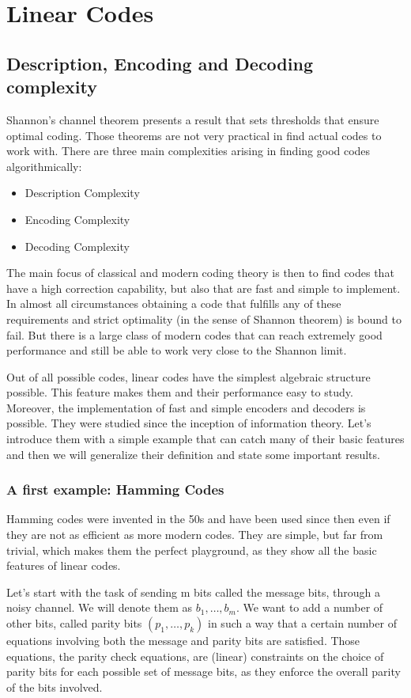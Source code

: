 
\chapter{Linear Codes}
\section{Description, Encoding and Decoding complexity}
Shannon's channel theorem presents a result that sets thresholds that ensure optimal coding. Those theorems are not very practical in find actual codes to work with. There are three main complexities arising in finding good codes algorithmically:
\begin{itemize}
	\item Description Complexity
	\item Encoding Complexity
	\item Decoding Complexity
\end{itemize}

The main focus of classical and modern coding theory is then to find codes that have a high correction capability, but also that are fast and simple to implement. In almost all circumstances obtaining a code that fulfills any of these requirements and strict optimality (in the sense of Shannon theorem) is bound to fail. But there is a large class of modern codes that can reach extremely good performance and still be able to work very close to the Shannon limit.

Out of all possible codes, linear codes have the simplest algebraic structure possible. This feature makes them and their performance easy to study. Moreover, the implementation of fast and simple encoders and decoders is possible. They were studied since the inception of information theory. Let's introduce them with a simple example that can catch many of their basic features and then we will generalize their definition and state some important results.

\subsection{A first example: Hamming Codes}
Hamming codes were invented in the 50s and have been used since then even if they are not as efficient as more modern codes. They are simple, but far from trivial, which makes them the perfect playground, as they show all the basic features of linear codes.

Let's start with the task of sending m bits called the message bits, through a noisy channel. We will denote them as $b_1, \dots, b_m$. We want to add a number of other bits, called parity bits $(p_1, \dots, p_k)$ in such a way that a certain number of equations involving both the message and parity bits are satisfied. Those equations, the parity check equations, are (linear) constraints on the choice of parity bits for each possible set of message bits, as they enforce the overall parity of the bits involved.

